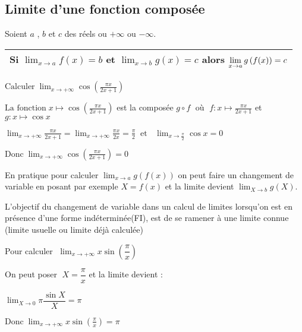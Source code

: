 
\everymath{\displaystyle}

 \summary{}
     
    \subsection{Limite d'une fonction composée}
      Soient $a$ , $b$
        et  $c$ des réels ou  $+\infty $ ou $-\infty $.
        
   \medskip
\begin{tabularx}{\textwidth}{|X|}
\hline
Si  $ \displaystyle\lim_{x \to a}f(x)=b $\; et \;  $ \displaystyle\lim_{x \to b}g(x)=c $\; alors \;  $ \displaystyle\lim_{x \to a}g\left(f(x)\right)=c $\\
\hline
\end{tabularx}
 \medskip
       \begin{example}
      $\text{Calculer}\; \displaystyle\lim_{x \to +\infty} \cos\left(\frac{\pi x}{2x+1}\right)$
      
       $ \text{La fonction} \; x \mapsto \cos\left(\frac{\pi x}{2x+1}\right)$ est la composée $ g\circ f\; $  où $\; f: x\mapsto\frac{\pi x}{2x+1}$  et $g: x \mapsto \cos x $
       
        $\displaystyle\lim_{x \to +\infty} \frac{\pi x}{2x+1}= \displaystyle\lim_{x \to +\infty} \frac{\pi x}{2x }=\frac{\pi }{2} \;\; \text{et }\;\; \displaystyle\lim_{x \to \frac{\pi }{2}} \cos x=0$
        
      $\text{Donc}\; \displaystyle\lim_{x \to +\infty} \cos\left(\frac{\pi x}{2x+1}\right)=0$
   \end{example}
     \begin{remark}
       En pratique pour calculer $\displaystyle\lim_{x \to a}g\left(f(x)\right) $ on peut faire  un changement de variable en posant par exemple   $X=f(x) $  et la limite devient  $\displaystyle\lim_{X \to b}g(X)$.
       
      L’objectif du changement de variable dans un calcul de limites lorsqu’on est en présence d’une forme indéterminée(FI), est de se ramener à une limite connue (limite usuelle ou limite déjà calculée)
     \end{remark}
\begin{example}
Pour calculer $\;\displaystyle \lim_{x \to +\infty} x\sin \left(\dfrac{\pi}{x}\right)$
 
     On peut poser $ \; X=\dfrac{\pi }{x}$  et la limite devient :
      
      $\displaystyle\lim_{X\to 0} \pi\dfrac{\sin X }{X}=\pi $
      
       $\text{Donc}\; \lim_{x \to +\infty} x\sin \left(\frac{\pi}{x}\right)=\pi$
   \end{example}
